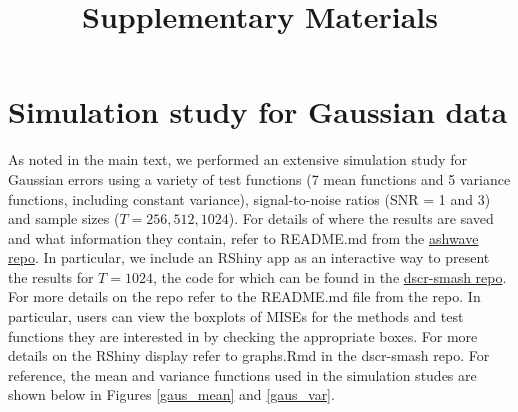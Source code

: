 \documentclass[12pt]{article}
\newcommand{\beginsupplement}{%
        \setcounter{table}{0}
        \renewcommand{\thetable}{S\arabic{table}}%
        \setcounter{figure}{0}
        \renewcommand{\thefigure}{S\arabic{figure}}%
     }
\begin{document}
\beginsupplement

\title{\textbf{Supplementary Materials}}
\date{}
\maketitle

\section{Simulation study for Gaussian data}
As noted in the main text, we performed an extensive simulation study for Gaussian errors using a variety of test functions (7 mean functions and 5 variance functions, including constant variance), signal-to-noise ratios (SNR = 1 and 3) and sample sizes ($T=256,512,1024$). For details of where the results are saved and what information they contain, refer to README.md from the \href{https://github.com/stephenslab/ashwave}{ashwave repo}. In particular, we include an RShiny app as an interactive way to present the results for $T=1024$, the code for which can be found in the \href{https://github.com/zrxing/dscr-smash}{dscr-smash repo}. For more details on the repo refer to the README.md file from the repo. In particular, users can view the boxplots of MISEs for the methods and test functions they are interested in by checking the appropriate boxes. For more details on the RShiny display refer to graphs.Rmd in the dscr-smash repo. For reference, the mean and variance functions used in the simulation studes are shown below in Figures \ref{gaus_mean} and \ref{gaus_var}.
\end{document}
